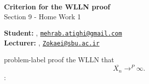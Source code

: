 	






		\begin{Large}
		\textsf{\textbf{Criterion for the WLLN proof}}\\
		Section 9 - Home Work 1
	\end{Large}
	
	\vspace{1ex}
	
	\textsf{\textbf{Student:}} , \href{mailto:mehrab.atighi@gmail.com}{\texttt{mehrab.atighi@gmail.com}}\\
	\textsf{\textbf{Lecturer:}} , \href{mailto:Zokaei@sbu.ac.ir}{\texttt{Zokaei@sbu.ac.ir}}
	
	
	\vspace{2ex}
	
	\begin{problem}{}{problem-label}
		proof the WLLN that
		$$\overline{X_n} \to^P \infty.$$
		\cite{Embrechts.etal1997}:
	\end{problem}
	

